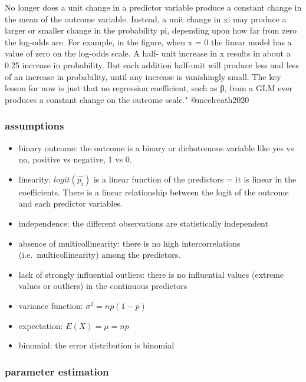 \documentclass[
]{article}
\begin{document}
No longer does a unit change in a predictor variable produce a constant
change in the mean of the outcome variable. Instead, a unit change in xi
may produce a larger or smaller change in the probability pi, depending
upon how far from zero the log-odds are. For example, in the figure,
when x = 0 the linear model has a value of zero on the log-odds scale. A
half- unit increase in x results in about a 0.25 increase in
probability. But each addition half-unit will produce less and less of
an increase in probability, until any increase is vanishingly small. The
key lesson for now is just that no regression coefficient, such as β,
from a GLM ever produces a constant change on the outcome scale."
@mcelreath2020

\hypertarget{assumptions-1}{%
\subsubsection{assumptions}\label{assumptions-1}}

\begin{itemize}
\item
  binary outcome: the outcome is a binary or dichotomous variable like
  yes vs no, positive vs negative, 1 vs 0.
\item
  linearity: \(logit(\hat{p_i})\) is a linear function of the predictors
  = it is linear in the coefficients. There is a linear relationship
  between the logit of the outcome and each predictor variables.
\item
  independence: the different observations are statistically independent
\item
  absence of multicollinearity: there is no high intercorrelations
  (i.e.~multicollinearity) among the predictors.
\item
  lack of strongly influential outliers: there is no influential values
  (extreme values or outliers) in the continuous predictors
\item
  variance function: \(\sigma^2 = np(1-p)\)
\item
  expectation: \(E(X)= \mu= np\)
\item
  binomial: the error distribution is binomial
\end{itemize}

\hypertarget{parameter-estimation-1}{%
\subsubsection{parameter estimation}\label{parameter-estimation-1}}
\end{document}
